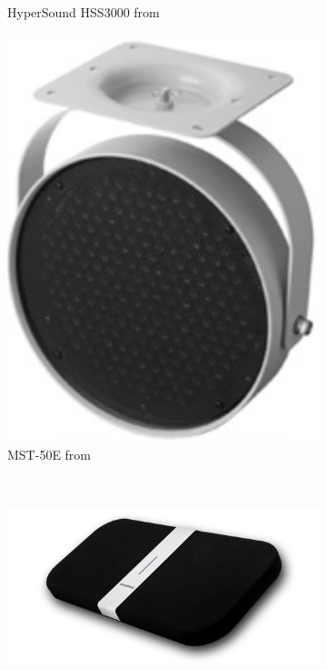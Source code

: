 \begin{figure}[!htb]
\begin{subfigure}{0.3\textwidth}
        \caption{HyperSound HSS3000 from \cite{TurtleBeachCorporationHyperSoundHSS300}}
    \end{subfigure}
    \hfill
    \begin{subfigure}{0.2\textwidth}
        \centering
        \includegraphics[width=\textwidth]{fig/CommercialProducts/MSP-50E_resize.png}
        \caption{MST-50E from \cite{MitsubishiElectricMSP050E}}
    \end{subfigure}
    \\
    \begin{subfigure}{0.35\textwidth}
        \centering
        \includegraphics[width=\textwidth]{fig/CommercialProducts/Acouspade-directional-Sound-Speaker_resize.jpg}

\end{subfigure}
\end{figure}

